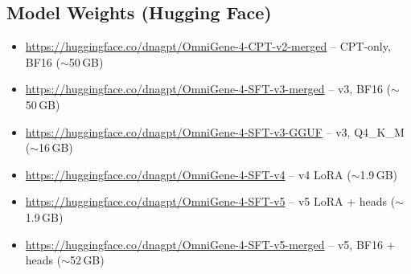 \documentclass[11pt]{article}
\begin{document}
\subsection{Model Weights (Hugging Face)}

\begin{itemize}
\item \url{https://huggingface.co/dnagpt/OmniGene-4-CPT-v2-merged} -- CPT-only, BF16 ($\sim$50\,GB)
\item \url{https://huggingface.co/dnagpt/OmniGene-4-SFT-v3-merged} -- v3, BF16 ($\sim$50\,GB)
\item \url{https://huggingface.co/dnagpt/OmniGene-4-SFT-v3-GGUF} -- v3, Q4\_K\_M ($\sim$16\,GB)
\item \url{https://huggingface.co/dnagpt/OmniGene-4-SFT-v4} -- v4 LoRA ($\sim$1.9\,GB)
\item \url{https://huggingface.co/dnagpt/OmniGene-4-SFT-v5} -- v5 LoRA + heads ($\sim$1.9\,GB)
\item \url{https://huggingface.co/dnagpt/OmniGene-4-SFT-v5-merged} -- v5, BF16 + heads ($\sim$52\,GB)
\end{itemize}
\end{document}
